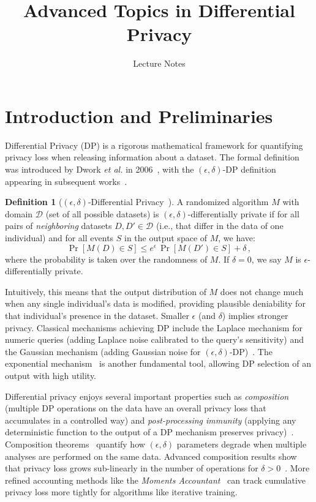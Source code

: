 \documentclass[11pt]{article}
\theoremstyle{remark}
\theoremstyle{definition}
\newtheorem{definition}{Definition}
\theoremstyle{plain}
\begin{document}
\title{Advanced Topics in Differential Privacy}
\author{Lecture Notes}
\date{}
\maketitle

\section{Introduction and Preliminaries}

Differential Privacy (DP) is a rigorous mathematical framework for quantifying privacy loss when releasing information about a dataset. The formal definition was introduced by Dwork \textit{et al.} in 2006~\cite{Dwork2006}, with the $(\epsilon, \delta)$-DP definition appearing in subsequent works~\cite{DMNS06, DworkRoth2014}. 

\begin{definition}[$(\epsilon,\delta)$-Differential Privacy~\cite{DMNS06}]
A randomized algorithm $M$ with domain $\mathcal{D}$ (set of all possible datasets) is $(\epsilon,\delta)$-differentially private if for all pairs of \emph{neighboring} datasets $D, D' \in \mathcal{D}$ (i.e., that differ in the data of one individual) and for all events $S$ in the output space of $M$, we have:
\[
\Pr[M(D) \in S] \le e^{\epsilon}\, \Pr[M(D') \in S] + \delta\,,
\] 
where the probability is taken over the randomness of $M$. If $\delta = 0$, we say $M$ is $\epsilon$-differentially private.
\end{definition}

Intuitively, this means that the output distribution of $M$ does not change much when any single individual's data is modified, providing plausible deniability for that individual's presence in the dataset. Smaller $\epsilon$ (and $\delta$) implies stronger privacy. Classical mechanisms achieving DP include the Laplace mechanism for numeric queries (adding Laplace noise calibrated to the query's sensitivity) and the Gaussian mechanism (adding Gaussian noise for $(\epsilon,\delta)$-DP)~\cite{DworkRoth2014}. The exponential mechanism~\cite{McSherry2007} is another fundamental tool, allowing DP selection of an output with high utility.

Differential privacy enjoys several important properties such as \emph{composition} (multiple DP operations on the data have an overall privacy loss that accumulates in a controlled way) and \emph{post-processing immunity} (applying any deterministic function to the output of a DP mechanism preserves privacy)~\cite{DworkRoth2014}. Composition theorems~\cite{DworkRoth2014, Kairouz2017} quantify how $(\epsilon,\delta)$ parameters degrade when multiple analyses are performed on the same data. Advanced composition results show that privacy loss grows sub-linearly in the number of operations for $\delta > 0$~\cite{DworkRoth2014}. More refined accounting methods like the \emph{Moments Accountant}~\cite{Abadi2016} can track cumulative privacy loss more tightly for algorithms like iterative training.
\end{document}
